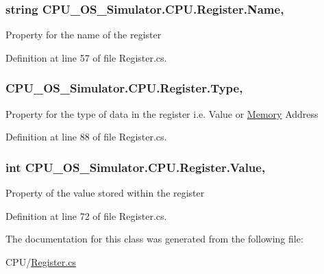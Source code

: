 \subsubsection[{Name}]{\setlength{\rightskip}{0pt plus 5cm}string C\+P\+U\+\_\+\+O\+S\+\_\+\+Simulator.\+C\+P\+U.\+Register.\+Name\hspace{0.3cm}{\ttfamily [get]}, {\ttfamily [set]}}\label{class_c_p_u___o_s___simulator_1_1_c_p_u_1_1_register_a75621754d2c4c740c52b6c21a8151dc4}


Property for the name of the register 



Definition at line 57 of file Register.\+cs.

\hypertarget{class_c_p_u___o_s___simulator_1_1_c_p_u_1_1_register_ac9df7ddedb74ab974a57a334b42e0381}{}
\subsubsection[{Type}]{ C\+P\+U\+\_\+\+O\+S\+\_\+\+Simulator.\+C\+P\+U.\+Register.\+Type\hspace{0.3cm}{\ttfamily [get]}, {\ttfamily [set]}}\label{class_c_p_u___o_s___simulator_1_1_c_p_u_1_1_register_ac9df7ddedb74ab974a57a334b42e0381}


Property for the type of data in the register i.\+e. Value or \hyperlink{namespace_c_p_u___o_s___simulator_1_1_memory}{Memory} Address 



Definition at line 88 of file Register.\+cs.

\hypertarget{class_c_p_u___o_s___simulator_1_1_c_p_u_1_1_register_a1cabe4ad65d4dc6267be9f34d682e181}{}
\subsubsection[{Value}]{\setlength{\rightskip}{0pt plus 5cm}int C\+P\+U\+\_\+\+O\+S\+\_\+\+Simulator.\+C\+P\+U.\+Register.\+Value\hspace{0.3cm}{\ttfamily [get]}, {\ttfamily [set]}}\label{class_c_p_u___o_s___simulator_1_1_c_p_u_1_1_register_a1cabe4ad65d4dc6267be9f34d682e181}


Property of the value stored within the register 



Definition at line 72 of file Register.\+cs.



The documentation for this class was generated from the following file\+:\begin{DoxyCompactItemize}
\item 
C\+P\+U/\hyperlink{_register_8cs}{Register.\+cs}\end{DoxyCompactItemize}

